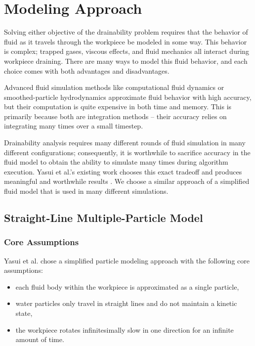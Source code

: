 						\chapter{Modeling Approach}

Solving either objective of the drainability problem requires that the behavior of fluid as it travels through the workpiece be modeled in some way. This behavior is complex; trapped gases, viscous effects, and fluid mechanics all interact during workpiece draining. There are many ways to model this fluid behavior, and each choice comes with both advantages and disadvantages.

Advanced fluid simulation methods like computational fluid dynamics or smoothed-particle hydrodynamics approximate fluid behavior with high accuracy, but their computation is quite expensive in both time and memory. This is primarily because both are integration methods -- their accuracy relies on integrating many times over a small timestep.

Drainability analysis requires many different rounds of fluid simulation in many different configurations; consequently, it is worthwhile to sacrifice accuracy in the fluid model to obtain the ability to simulate many times during algorithm execution. Yasui et al.'s existing work chooses this exact tradeoff and produces meaningful and worthwhile results \cite{Yasui2011}. We choose a similar approach of a simplified fluid model that is used in many different simulations.

\section{Straight-Line Multiple-Particle Model}

	\subsection{Core Assumptions}

Yasui et al. \cite{Yasui2011} chose a simplified particle modeling approach with the following core assumptions:

\begin{itemize}
	\item each fluid body within the workpiece is approximated as a single particle,
	\item water particles only travel in straight lines and do not maintain a kinetic state,
	\item the workpiece rotates infinitesimally slow in one direction for an infinite amount of time.
\end{itemize}

